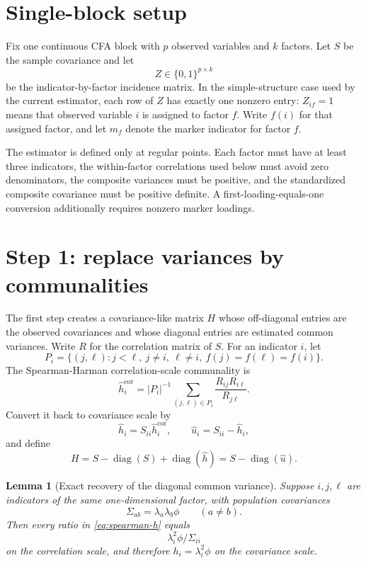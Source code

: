 \documentclass[11pt]{article}
\newcommand{\diag}{\operatorname{diag}}
\theoremstyle{plain}
\newtheorem{lemma}{Lemma}
\theoremstyle{remark}
\begin{document}
\section{Single-block setup}

Fix one continuous CFA block with \(p\) observed variables and \(k\) factors.
Let \(S\) be the sample covariance and let
\[
  Z\in\{0,1\}^{p\times k}
\]
be the indicator-by-factor incidence matrix. In the simple-structure case used
by the current estimator, each row of \(Z\) has exactly one nonzero entry:
\(Z_{if}=1\) means that observed variable \(i\) is assigned to factor \(f\).
Write \(f(i)\) for that assigned factor, and let \(m_f\) denote the marker
indicator for factor \(f\).

The estimator is defined only at regular points. Each factor must have at least
three indicators, the within-factor correlations used below must avoid zero
denominators, the composite variances must be positive, and the standardized
composite covariance must be positive definite. A first-loading-equals-one
conversion additionally requires nonzero marker loadings.

\section{Step 1: replace variances by communalities}

The first step creates a covariance-like matrix \(H\) whose off-diagonal entries
are the observed covariances and whose diagonal entries are estimated common
variances. Write \(R\) for the correlation matrix of \(S\). For an indicator
\(i\), let
\[
  P_i
  =
  \{(j,\ell): j<\ell,\ j\ne i,\ \ell\ne i,\ f(j)=f(\ell)=f(i)\}.
\]
The Spearman-Harman correlation-scale communality is
\begin{equation}\label{eq:spearman-h}
  \hat h_i^{\mathrm{cor}}
  =
  |P_i|^{-1}
  \sum_{(j,\ell)\in P_i}
    \frac{R_{ij}R_{i\ell}}{R_{j\ell}} .
\end{equation}
Convert it back to covariance scale by
\[
  \hat h_i = S_{ii}\hat h_i^{\mathrm{cor}},
  \qquad
  \hat u_i = S_{ii}-\hat h_i ,
\]
and define
\begin{equation}\label{eq:H}
  H
  =
  S-\diag(S)+\diag(\hat h)
  =
  S-\diag(\hat u).
\end{equation}

\begin{lemma}[Exact recovery of the diagonal common variance]
\label{lem:spearman}
Suppose \(i,j,\ell\) are indicators of the same one-dimensional factor, with
population covariances
\[
  \Sigma_{ab}=\lambda_a\lambda_b\phi
  \qquad (a\ne b).
\]
Then every ratio in \eqref{eq:spearman-h} equals
\[
  \lambda_i^2\phi / \Sigma_{ii}
\]
on the correlation scale, and therefore \(h_i=\lambda_i^2\phi\) on the
covariance scale.
\end{lemma}
\end{document}
